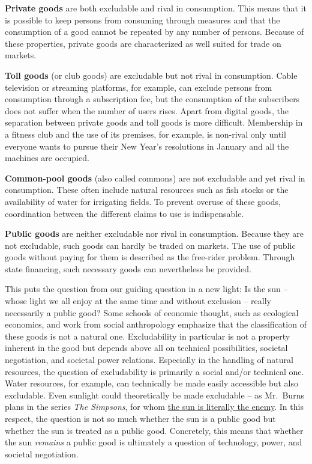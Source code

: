 \documentclass[
  british,
  a4paper,
  DIV=11,
  numbers=noendperiod,
  oneside,
  openany]{scrreprt}
\begin{document}
\textbf{Private goods} are both excludable and rival in consumption.
This means that it is possible to keep persons from consuming through
measures and that the consumption of a good cannot be repeated by any
number of persons. Because of these properties, private goods are
characterized as well suited for trade on markets.

\textbf{Toll goods} (or club goods) are excludable but not rival in
consumption. Cable television or streaming platforms, for example, can
exclude persons from consumption through a subscription fee, but the
consumption of the subscribers does not suffer when the number of users
rises. Apart from digital goods, the separation between private goods
and toll goods is more difficult. Membership in a fitness club and the
use of its premises, for example, is non-rival only until everyone wants
to pursue their New Year's resolutions in January and all the machines
are occupied.

\textbf{Common-pool goods} (also called commons) are not excludable and
yet rival in consumption. These often include natural resources such as
fish stocks or the availability of water for irrigating fields. To
prevent overuse of these goods, coordination between the different
claims to use is indispensable.

\textbf{Public goods} are neither excludable nor rival in consumption.
Because they are not excludable, such goods can hardly be traded on
markets. The use of public goods without paying for them is described as
the free-rider problem. Through state financing, such necessary goods
can nevertheless be provided.

This puts the question from our guiding question in a new light: Is the
sun -- whose light we all enjoy at the same time and without exclusion
-- really necessarily a public good? Some schools of economic thought,
such as ecological economics, and work from social anthropology
emphasize that the classification of these goods is not a natural one.
Excludability in particular is not a property inherent in the good but
depends above all on technical possibilities, societal negotiation, and
societal power relations. Especially in the handling of natural
resources, the question of excludability is primarily a social and/or
technical one. Water resources, for example, can technically be made
easily accessible but also excludable. Even sunlight could theoretically
be made excludable -- as Mr.~Burns plans in the series \emph{The
Simpsons}, for whom
\href{https://www.youtube.com/watch?v=L3LbxDZRgA4}{the sun is literally
the enemy}. In this respect, the question is not so much whether the sun
is a public good but whether the sun is treated as a public good.
Concretely, this means that whether the sun \emph{remains} a public good
is ultimately a question of technology, power, and societal negotiation.
\end{document}
